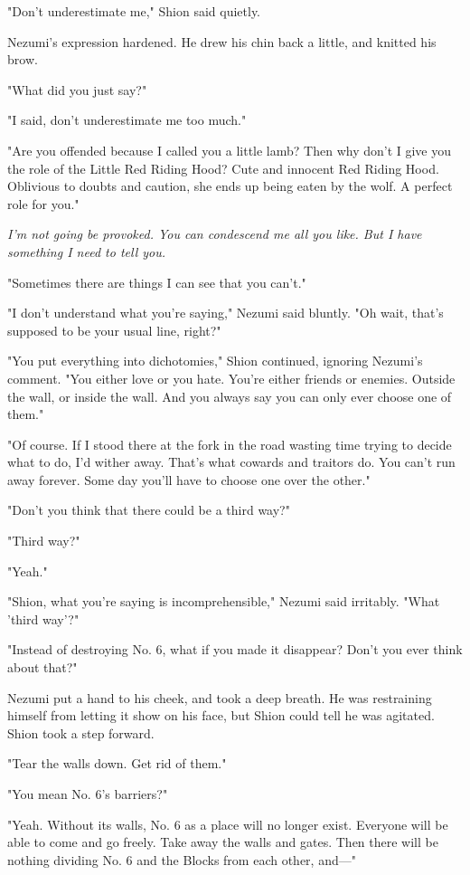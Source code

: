 "Don't underestimate me," Shion said quietly.

Nezumi's expression hardened. He drew his chin back a little, and
knitted his brow.

"What did you just say?"

"I said, don't underestimate me too much."

"Are you offended because I called you a little lamb? Then why don't I
give you the role of the Little Red Riding Hood? Cute and innocent Red
Riding Hood. Oblivious to doubts and caution, she ends up being eaten by
the wolf. A perfect role for you."

\emph{I'm not going be provoked. You can condescend me all you like. But I
have something I need to tell you.}

"Sometimes there are things I can see that you can't."

"I don't understand what you're saying," Nezumi said bluntly. "Oh wait,
that's supposed to be your usual line, right?"

"You put everything into dichotomies," Shion continued, ignoring
Nezumi's comment. "You either love or you hate. You're either friends or
enemies. Outside the wall, or inside the wall. And you always say you
can only ever choose one of them."

"Of course. If I stood there at the fork in the road wasting time trying
to decide what to do, I'd wither away. That's what cowards and traitors
do. You can't run away forever. Some day you'll have to choose one over
the other."

"Don't you think that there could be a third way?"

"Third way?"

"Yeah."

"Shion, what you're saying is incomprehensible," Nezumi said irritably.
"What 'third way'?"

"Instead of destroying No. 6, what if you made it disappear? Don't you
ever think about that?"

Nezumi put a hand to his cheek, and took a deep breath. He was
restraining himself from letting it show on his face, but Shion could
tell he was agitated. Shion took a step forward.

"Tear the walls down. Get rid of them."

"You mean No. 6's barriers?"

"Yeah. Without its walls, No. 6 as a place will no longer exist.
Everyone will be able to come and go freely. Take away the walls and
gates. Then there will be nothing dividing No. 6 and the Blocks from
each other, and---"

